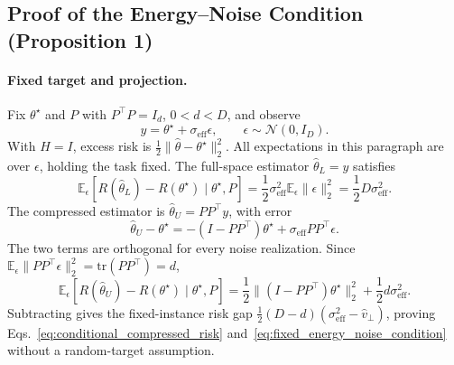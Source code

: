 \subsection{Proof of the Energy--Noise Condition (Proposition 1)}
\label{app:energy_noise_condition}

\paragraph{Fixed target and projection.}
Fix $\theta^\star$ and $P$ with $P^\top P=I_d$, $0<d<D$, and observe
\begin{equation}
y=\theta^\star+\sigma_{\mathrm{eff}}\epsilon,
\qquad \epsilon\sim\mathcal N(0,I_D).
\label{eq:app_energy_obs}
\end{equation}
With $H=I$, excess risk is $\frac12\|\hat\theta-\theta^\star\|_2^2$.
All expectations in this paragraph are over $\epsilon$, holding the task fixed.
The full-space estimator $\hat\theta_L=y$ satisfies
\begin{equation}
\mathbb E_\epsilon\!\left[R(\hat\theta_L)-R(\theta^\star)\mid\theta^\star,P\right]
=\frac12\sigma_{\mathrm{eff}}^2\mathbb E_\epsilon\|\epsilon\|_2^2
=\frac12D\sigma_{\mathrm{eff}}^2.
\label{eq:app_energy_lora_risk}
\end{equation}
The compressed estimator is $\hat\theta_U=PP^\top y$, with error
\begin{equation}
\hat\theta_U-\theta^\star
=-(I-PP^\top)\theta^\star+\sigma_{\mathrm{eff}}PP^\top\epsilon.
\label{eq:app_energy_error_decomp}
\end{equation}
The two terms are orthogonal for every noise realization. Since
$\mathbb E_\epsilon\|PP^\top\epsilon\|_2^2=\mathrm{tr}(PP^\top)=d$,
\begin{equation}
\mathbb E_\epsilon\!\left[R(\hat\theta_U)-R(\theta^\star)\mid\theta^\star,P\right]
=\frac12\|(I-PP^\top)\theta^\star\|_2^2+\frac12d\sigma_{\mathrm{eff}}^2.
\label{eq:app_energy_compressed_risk}
\end{equation}
Subtracting gives the fixed-instance risk gap
$\frac12(D-d)(\sigma_{\mathrm{eff}}^2-\hat v_\perp)$, proving
Eqs.~\eqref{eq:conditional_compressed_risk} and~\eqref{eq:fixed_energy_noise_condition} without a random-target assumption.

